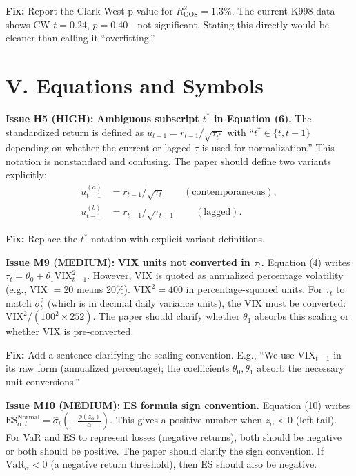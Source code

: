 \documentclass[12pt,a4paper]{article}
\begin{document}
\textbf{Fix:} Report the Clark-West p-value for $R^2_{\mathrm{OOS}} = 1.3\%$. The current K998 data shows CW $t = 0.24$, $p = 0.40$---not significant. Stating this directly would be cleaner than calling it ``overfitting.''


\section*{V. Equations and Symbols}

\textcolor{errorred}{\textbf{Issue H5 (HIGH):}} \textbf{Ambiguous subscript $t^*$ in Equation (6).} The standardized return is defined as $u_{t-1} = r_{t-1}/\sqrt{\tau_{t^*}}$ with ``$t^* \in \{t, t-1\}$ depending on whether the current or lagged $\tau$ is used for normalization.'' This notation is nonstandard and confusing. The paper should define two variants explicitly:
\begin{align*}
u_{t-1}^{(a)} &= r_{t-1}/\sqrt{\tau_t} \qquad (\text{contemporaneous}), \\
u_{t-1}^{(b)} &= r_{t-1}/\sqrt{\tau_{t-1}} \qquad (\text{lagged}).
\end{align*}

\textbf{Fix:} Replace the $t^*$ notation with explicit variant definitions.

\bigskip

\textcolor{warncolor}{\textbf{Issue M9 (MEDIUM):}} \textbf{VIX units not converted in $\tau_t$.} Equation (4) writes $\tau_t = \theta_0 + \theta_1 \mathrm{VIX}_{t-1}^2$. However, VIX is quoted as annualized percentage volatility (e.g., VIX $= 20$ means 20\%). $\mathrm{VIX}^2 = 400$ in percentage-squared units. For $\tau_t$ to match $\sigma_t^2$ (which is in decimal daily variance units), the VIX must be converted: $\mathrm{VIX}^2/(100^2 \times 252)$. The paper should clarify whether $\theta_1$ absorbs this scaling or whether VIX is pre-converted.

\textbf{Fix:} Add a sentence clarifying the scaling convention. E.g., ``We use $\mathrm{VIX}_{t-1}$ in its raw form (annualized percentage); the coefficients $\theta_0, \theta_1$ absorb the necessary unit conversions.''

\bigskip

\textcolor{warncolor}{\textbf{Issue M10 (MEDIUM):}} \textbf{ES formula sign convention.} Equation (10) writes $\mathrm{ES}_{\alpha,t}^{\text{Normal}} = \hat{\sigma}_t \left(-\frac{\phi(z_\alpha)}{\alpha}\right)$. This gives a positive number when $z_\alpha < 0$ (left tail). For VaR and ES to represent losses (negative returns), both should be negative or both should be positive. The paper should clarify the sign convention. If $\mathrm{VaR}_\alpha < 0$ (a negative return threshold), then ES should also be negative.
\end{document}
